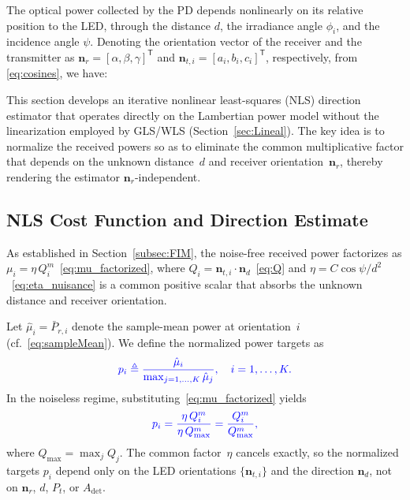 \documentclass[journal]{IEEEtran}
\newcommand{\added}[1]{{\color{blue}#1}}
\newcommand{\deleted}[1]{{\color{red}#1}}
\begin{document}
\deleted{The optical power collected by the PD depends nonlinearly on its
relative position to the LED, through the distance $d$, the irradiance angle
$\phi_{i}$, and the incidence angle $\psi$.  Denoting the orientation vector of the receiver
and the transmitter as $\mathbf n_{r}=[\alpha,\beta,\gamma]^{\mathsf T}$ and $\mathbf n_{t,i}=[a_i,b_i,c_i]^{\mathsf T}$, respectively, from \eqref{eq:cosines}, we have:}

\added{This section develops an iterative nonlinear least-squares (NLS) direction estimator that operates directly on the Lambertian power model without the linearization employed by GLS/WLS (Section~\ref{sec:Lineal}). The key idea is to normalize the received powers so as to eliminate the common multiplicative factor that depends on the unknown distance~$d$ and receiver orientation~$\mathbf{n}_r$, thereby rendering the estimator $\mathbf{n}_r$-independent.}

\added{\subsection{NLS Cost Function and Direction Estimate}}

\added{As established in Section~\ref{subsec:FIM}, the noise-free received power factorizes as $\mu_i = \eta\,Q_i^m$~\eqref{eq:mu_factorized}, where $Q_i = \mathbf{n}_{t,i}\cdot\mathbf{n}_d$~\eqref{eq:Q} and $\eta = C\cos\psi/d^2$~\eqref{eq:eta_nuisance} is a common positive scalar that absorbs the unknown distance and receiver orientation.}

\added{Let $\hat\mu_i = \bar P_{r,i}$ denote the sample-mean power at orientation~$i$ (cf.~\eqref{eq:sampleMean}). We define the normalized power targets as}
\begin{equation}
\added{p_i \triangleq \frac{\hat\mu_i}{\max_{j=1,\ldots,K}\hat\mu_j}, \quad i=1,\ldots,K.}
\label{eq:p_target}
\end{equation}
\added{In the noiseless regime, substituting~\eqref{eq:mu_factorized} yields}
\begin{equation}
\added{p_i = \frac{\eta\,Q_i^m}{\eta\,Q_{\max}^m} = \frac{Q_i^m}{Q_{\max}^m},}
\label{eq:p_target_noiseless}
\end{equation}
\added{where $Q_{\max}=\max_j Q_j$. The common factor~$\eta$ cancels exactly, so the normalized targets $p_i$ depend only on the LED orientations $\{\mathbf{n}_{t,i}\}$ and the direction $\mathbf{n}_d$, not on $\mathbf{n}_r$, $d$, $P_t$, or $A_{\mathrm{det}}$.}
\end{document}
